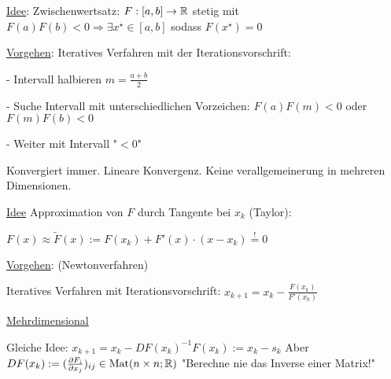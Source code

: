 \vspace{1\baselineskip}


\vspace{1\baselineskip}

\underline{}

\vspace{1\baselineskip}

\underline{Idee}: Zwischenwertsatz:
$F:[a,b] \rightarrow \mathbb{R}$ stetig mit $F(a) F(b) < 0 \Rightarrow \exists x^\star \in [a,b]$
sodass $F(x^\star) = 0$

\underline{Vorgehen}:
Iteratives Verfahren mit der Iterationsvorschrift:

- Intervall halbieren $m=\frac{a+b}{2}$

- Suche Intervall mit unterschiedlichen Vorzeichen:
$F(a) F(m) < 0$ oder $F(m) F(b) < 0$

- Weiter mit Intervall "$<0$"

\vspace{1\baselineskip}

Konvergiert immer. Lineare Konvergenz. Keine verallgemeinerung in mehreren
Dimensionen.

\vspace{1\baselineskip}

\underline{}

\vspace{1\baselineskip}

\underline{Idee}
Approximation von $F$ durch Tangente bei $x_k$ (Taylor):

$F(x) \approx \tilde{F} (x) := F(x_k) + F'(x) \cdot (x-x_k) \stackrel{!}{=} 0$

\underline{Vorgehen}:
(Newtonverfahren)

Iteratives Verfahren mit Iterationsvorschrift:
$x_{k+1} = x_k - \frac{F(x_k)}{F'(x_k)}$

\vspace{1\baselineskip}

\underline{Mehrdimensional}

Gleiche Idee: $x_{k+1} = x_k - DF(x_k)^{-1} F(x_k) := x_k - s_k$
Aber $DF(x_k) := (\frac{\partial F_i}{\partial x_j})_{ij} \in \text{Mat}(n \times n;\mathbb{R})$
"Berechne nie das Inverse einer Matrix!"

